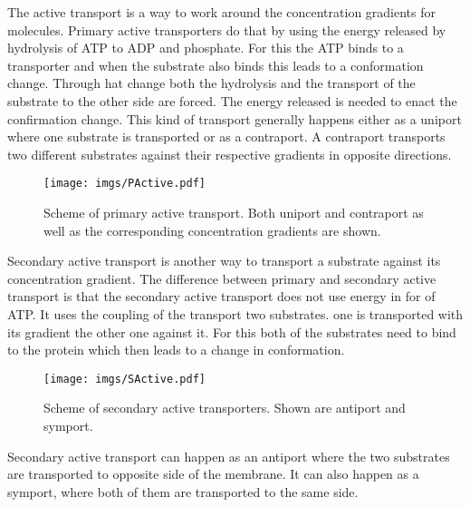 The active transport is a way to work around the concentration gradients for molecules. Primary active transporters do that by using the energy released by hydrolysis of ATP to ADP and phosphate. For this the ATP binds to a transporter and when the substrate also binds this leads to a conformation change. Through hat change both the hydrolysis and the transport of the substrate to the other side are forced. The energy released is needed to enact the confirmation change. 
This kind of transport generally happens either as a uniport where one substrate is transported or as a contraport. A contraport transports two different substrates against their respective gradients in opposite directions.

\begin{figure}[H]
    \centering
    \texttt{[image: imgs/PActive.pdf]}
    \caption{Scheme of primary active transport. Both uniport and contraport as well as the corresponding concentration gradients are shown.}
    \label{fig:PActive}
\end{figure}

Secondary active transport is another way to transport a substrate against its concentration gradient. The difference between primary and secondary active transport is that the secondary active transport does not use energy in for of ATP. It uses the coupling of the transport two substrates. one is transported with its gradient the other one against it. For this both of the substrates need to bind to the protein which then leads to a change in conformation. 

\begin{figure}[H]
    \centering
    \texttt{[image: imgs/SActive.pdf]}
    \caption{Scheme of secondary active transporters. Shown are antiport and symport.}
    \label{fig:SActive}
\end{figure}

Secondary active transport can happen as an antiport where the two substrates are transported to opposite side of the membrane. It can also happen as a symport, where both of them are transported to the same side. 